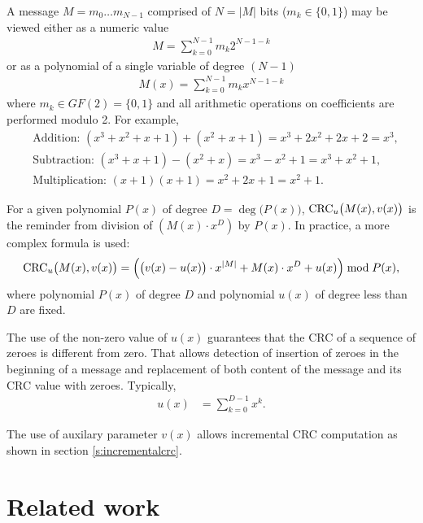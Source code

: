 \documentclass{article}
\begin{document}
A message $M = m_0 \dots m_{N-1}$ comprised of $N=|M|$ bits ($m_k \in \{0,
1\}$) may be viewed either as a numeric value
  \begin{align*}
    M = \sum_{k=0}^{N-1} m_k 2^{N-1-k}
  \end{align*}
or as a polynomial of a single variable of degree $(N-1)$
  \begin{align*}
    M(x) = \sum_{k=0}^{N-1} m_k x^{N-1-k}
  \end{align*}
where $m_k \in GF(2) = \{0, 1\}$ and all arithmetic operations on
coefficients are performed modulo 2. For example,
  \begin{align*}
    & \mbox{Addition: }
        (x^3+x^2+x+1) + (x^2+x+1) = x^3+2x^2+2x+2 = x^3, \\
    & \mbox{Subtraction: }
        (x^3+x+1) - (x^2+x) = x^3-x^2+1 = x^3+x^2+1, \\
    & \mbox{Multiplication: }
        (x+1)(x+1) = x^2 + 2x + 1 = x^2 + 1.
  \end{align*}

For a given polynomial $P(x)$ of degree $D=\deg\bigl(P(x)\bigr)$,
${\rm CRC}_u\bigl(M(x),v(x)\bigr)$ is the reminder from division of $\left(M(x)
\cdot x^D\right)$ by $P(x)$. In practice, a more complex formula is used:
  \begin{align}
    \label{e:crcdefinition}
    {\rm CRC}_u\bigl(M(x), v(x)\bigr)
      = \Bigl(\bigl(v(x)-u(x)\bigr) \cdot x^{|M|} + M(x) \cdot x^D + u(x)\Bigr)
        \bmod P(x),
  \end{align}
where polynomial $P(x)$ of degree $D$ and polynomial $u(x)$ of degree less
than $D$ are fixed.

The use of the non-zero value of $u(x)$ guarantees that the CRC of a sequence
of zeroes is different from zero. That allows detection of insertion of
zeroes in the beginning of a message and replacement of both content of the
message and its CRC value with zeroes. Typically,
  \begin{align}
    \label{e:constdefinition}
    u(x) &= \sum_{k=0}^{D-1} x^k.
  \end{align}

The use of auxilary parameter $v(x)$ allows incremental CRC computation
as shown in section \ref{s:incrementalcrc}.

\section{Related work}
\end{document}

